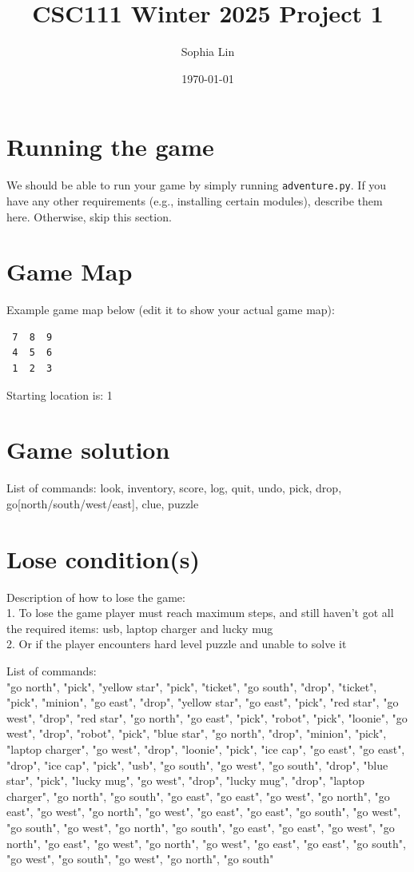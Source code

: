 \documentclass[11pt]{article}
\title{CSC111 Winter 2025 Project 1}
\author{Sophia Lin}
\date{\today}
\begin{document}
\maketitle

\section*{Running the game}
We should be able to run your game by simply running \texttt{adventure.py}. If you have any other requirements (e.g., installing certain modules), describe them here. Otherwise, skip this section.

\section*{Game Map}
Example game map below (edit it to show your actual game map):

\begin{verbatim}
 7  8  9
 4  5  6
 1  2  3
\end{verbatim}

Starting location is: 1

\section*{Game solution}
List of commands: look, inventory, score, log, quit, undo, pick, drop, go[north/south/west/east], clue, puzzle

\section*{Lose condition(s)}
Description of how to lose the game:
\\ 1. To lose the game player must reach maximum steps, and still haven't got all the required items: usb, laptop charger and lucky mug
\\ 2. Or if the player encounters hard level puzzle and unable to solve it

List of commands: \\ "go north", "pick", "yellow star", "pick", "ticket", "go south", "drop", "ticket", "pick",
                 "minion", "go east", "drop", "yellow star", "go east", "pick", "red star", "go west", "drop",
                 "red star", "go north", "go east", "pick", "robot", "pick", "loonie", "go west", "drop", "robot",
                 "pick", "blue star", "go north", "drop", "minion", "pick", "laptop charger", "go west", "drop",
                 "loonie", "pick", "ice cap", "go east", "go east", "drop", "ice cap", "pick", "usb", "go south",
                 "go west", "go south", "drop", "blue star", "pick", "lucky mug", "go west", "drop", "lucky mug",
                 "drop", "laptop charger", "go north", "go south", "go east", "go east", "go west", "go north",
                 "go east", "go west", "go north", "go west", "go east", "go east", "go south",
                 "go west", "go south", "go west", "go north", "go south", "go east", "go east", "go west", "go north",
                 "go east", "go west", "go north", "go west", "go east", "go east", "go south",
                 "go west", "go south", "go west", "go north", "go south"\\
\end{document}
